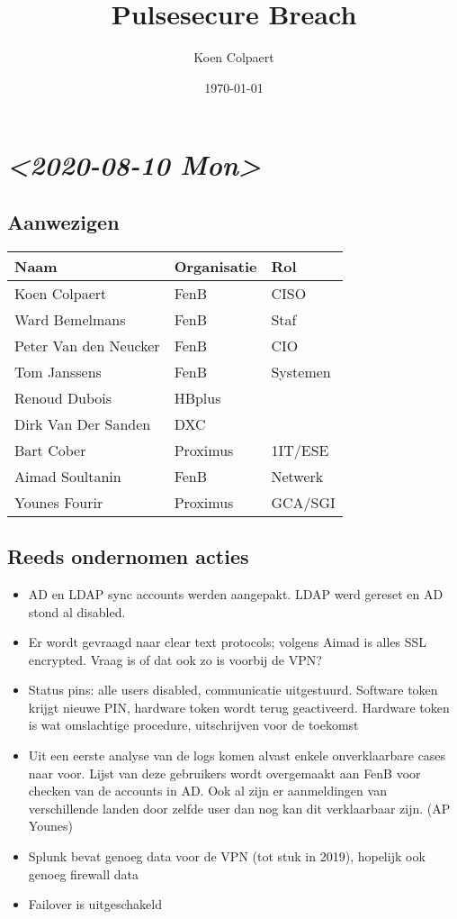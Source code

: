 \documentclass[11pt]{article}
\author{Koen Colpaert}
\date{\today}
\title{Pulsesecure Breach}
\begin{document}
\maketitle

\section{\textit{<2020-08-10 Mon>}}
\label{sec:orga9e28a1}

\subsection{Aanwezigen}
\label{sec:org6913eeb}

\begin{center}
\begin{tabular}{lll}
Naam & Organisatie & Rol\\
\hline
Koen Colpaert & FenB & CISO\\
Ward Bemelmans & FenB & Staf\\
Peter Van den Neucker & FenB & CIO\\
Tom Janssens & FenB & Systemen\\
Renoud Dubois & HBplus & \\
Dirk Van Der Sanden & DXC & \\
Bart Cober & Proximus & 1IT/ESE\\
Aimad Soultanin & FenB & Netwerk\\
Younes Fourir & Proximus & GCA/SGI\\
\end{tabular}
\end{center}

\subsection{Reeds ondernomen acties}
\label{sec:orgdb3650b}
\begin{itemize}
\item AD en LDAP sync accounts werden aangepakt. LDAP werd gereset en AD stond al disabled.
\item Er wordt gevraagd naar clear text protocols; volgens Aimad is alles SSL encrypted. Vraag is of dat ook zo is voorbij de VPN?
\item Status pins: alle users disabled, communicatie uitgestuurd. Software token krijgt nieuwe PIN, hardware token wordt terug geactiveerd. Hardware token is wat omslachtige procedure, uitschrijven voor de toekomst
\item Uit een eerste analyse van de logs komen alvast enkele onverklaarbare cases naar voor. Lijst van deze gebruikers wordt overgemaakt aan FenB voor checken van de accounts in AD. Ook al zijn er aanmeldingen van verschillende landen door zelfde user dan nog kan dit verklaarbaar zijn. (AP Younes)
\item Splunk bevat genoeg data voor de VPN (tot stuk in 2019), hopelijk ook genoeg firewall data
\item Failover is uitgeschakeld
\end{itemize}
\end{document}
